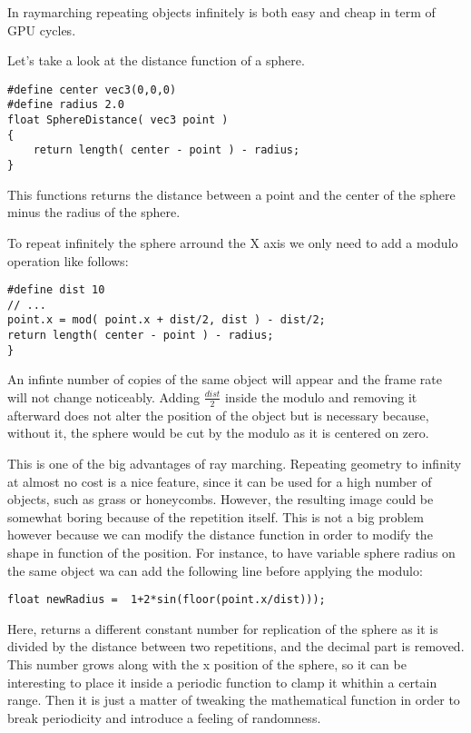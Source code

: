 In raymarching repeating objects infinitely is both easy and cheap in term of GPU cycles.

Let's take a look at the distance function of a sphere.

\begin{lstlisting}
#define center vec3(0,0,0)
#define radius 2.0
float SphereDistance( vec3 point )
{
    return length( center - point ) - radius;
}
\end{lstlisting}

This functions returns the distance between a point and the center of the sphere
minus the radius of the sphere.

To repeat infinitely the sphere arround the X axis we only need to add a modulo
operation like follows:

\begin{lstlisting}
#define dist 10
// ...
point.x = mod( point.x + dist/2, dist ) - dist/2;
return length( center - point ) - radius;
}
\end{lstlisting}

An infinte number of copies of the same object will appear and the frame rate will not change
noticeably. Adding $\frac{dist}{2}$ inside the modulo and removing it afterward does not alter
the position of the object but is necessary because, without it, the sphere would
be cut by the modulo as it is centered on zero.



This is one of the big advantages of ray marching. Repeating geometry to infinity
at almost no cost is a nice feature, since it can be used for a high number of objects,
such as grass or honeycombs. However, the resulting image could be somewhat boring because
of the repetition itself. This is not a big problem however because we can modify
the distance function in order to modify the shape in function of the position.
For instance, to have variable sphere radius on the same object wa can add the following
line before applying the modulo:

\begin{lstlisting}
float newRadius =  1+2*sin(floor(point.x/dist)));
\end{lstlisting}

Here,  returns a different constant number for replication
of the sphere as it is divided by the distance between two repetitions, and the decimal part
is removed. This number grows along with the x position of the sphere, so it
can be interesting to place it inside a periodic function to clamp it
whithin a certain range. Then it is just a matter of tweaking the mathematical
function in order to break periodicity and introduce a feeling of randomness.

